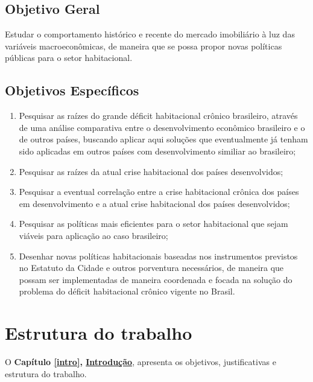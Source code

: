 \documentclass[
	12pt,				%
	oneside,			%
	a4paper,			%
	chapter=TITLE,		%
	section=TITLE,		%
	english,			%
	brazil				%
	]{abntex2}
\begin{document}
\begin{refsection}
\hypertarget{objetivo-geral}{%
\subsection{Objetivo Geral}\label{objetivo-geral}}

Estudar o comportamento histórico e recente do mercado imobiliário à luz das
variáveis macroeconômicas, de maneira que se possa propor novas políticas
públicas para o setor habitacional.

\hypertarget{objetivos-especuxedficos}{%
\subsection{Objetivos Específicos}\label{objetivos-especuxedficos}}
\begin{enumerate}
\def\labelenumi{\arabic{enumi}.}
\item
  Pesquisar as raízes do grande déficit habitacional crônico brasileiro,
  através de uma análise comparativa entre o desenvolvimento econômico brasileiro
  e o de outros países, buscando aplicar aqui soluções que eventualmente já tenham
  sido aplicadas em outros países com desenvolvimento similiar ao brasileiro;
\item
  Pesquisar as raízes da atual crise habitacional dos países desenvolvidos;
\item
  Pesquisar a eventual correlação entre a crise habitacional crônica dos
  países em desenvolvimento e a atual crise habitacional dos países desenvolvidos;
\item
  Pesquisar as políticas mais eficientes para o setor habitacional que sejam
  viáveis para aplicação ao caso brasileiro;
\item
  Desenhar novas políticas habitacionais baseadas nos instrumentos previstos no
  Estatuto da Cidade e outros porventura necessários, de maneira que possam ser
  implementadas de maneira coordenada e focada na solução do problema do
  déficit habitacional crônico vigente no Brasil.
\end{enumerate}
\hypertarget{estrutura-do-trabalho}{%
\section{Estrutura do trabalho}\label{estrutura-do-trabalho}}

O \textbf{Capítulo \ref{intro}, \protect\hyperlink{introduuxe7uxe3o-5}{Introdução}}, apresenta os objetivos, justificativas e
estrutura do trabalho.


\end{refsection}
\end{document}
